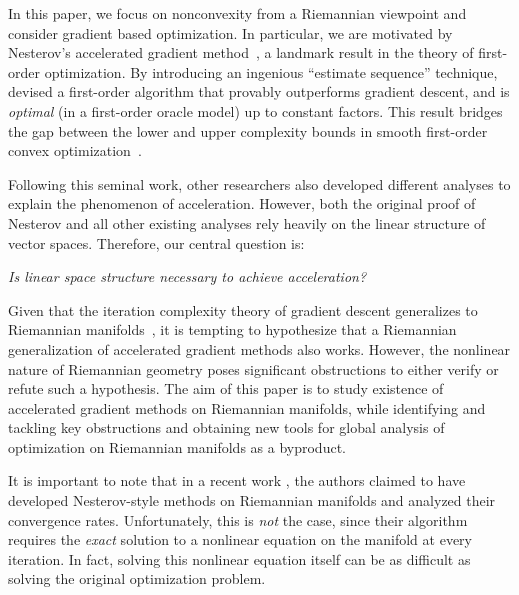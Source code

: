 
In this paper, we focus on nonconvexity from a Riemannian viewpoint and consider gradient based optimization. In particular, we are motivated by Nesterov's accelerated gradient method~\citep{nesterov1983method}, a landmark result in the theory of first-order optimization. By introducing an ingenious ``estimate sequence'' technique, \citet{nesterov1983method} devised a first-order algorithm that provably outperforms gradient descent, and is \emph{optimal} (in a first-order oracle model) up to constant factors. This result bridges the gap between the lower and upper complexity bounds in smooth first-order convex optimization~\citep{nemirovsky1983problem, nesterov2004introductory}. 

Following this seminal work, other researchers also developed different analyses to explain the phenomenon of  acceleration. However, both the original proof of Nesterov and all other existing analyses rely heavily on the linear structure of vector spaces. Therefore, our central question is: 
\begin{center}
  \emph{Is linear space structure necessary to achieve acceleration?}
\end{center}
Given that the iteration complexity theory of gradient descent generalizes to Riemannian manifolds~\citep{zhang2016first}, it is tempting to hypothesize that a Riemannian generalization of accelerated gradient methods also works. However, the nonlinear nature of Riemannian geometry poses significant obstructions to either verify or refute such a hypothesis. The aim of this paper is to study existence of accelerated gradient methods on Riemannian manifolds, while identifying and tackling key obstructions and obtaining new tools for global analysis of optimization on Riemannian manifolds as a byproduct.

It is important to note that in a recent work \citep{liu2017accelerated}, the authors claimed to have developed Nesterov-style methods on Riemannian manifolds and analyzed their convergence rates. Unfortunately, this is \emph{not} the case, since their algorithm requires the \emph{exact} solution to a nonlinear equation \cite[(4) and (5)]{liu2017accelerated} on the manifold at every iteration. In fact, solving this nonlinear equation itself can be as difficult as solving the original optimization problem.

